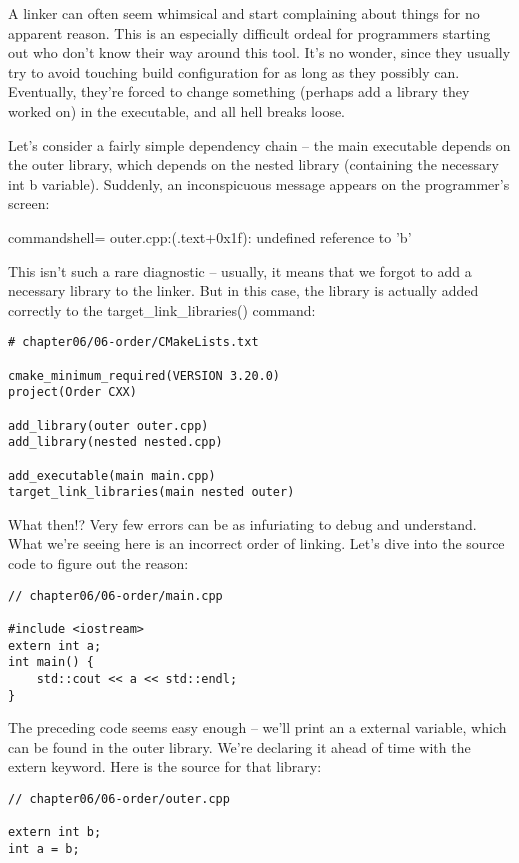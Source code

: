 A linker can often seem whimsical and start complaining about things for no apparent reason. This is an especially difficult ordeal for programmers starting out who don't know their way around this tool. It's no wonder, since they usually try to avoid touching build configuration for as long as they possibly can. Eventually, they're forced to change something (perhaps add a library they worked on) in the executable, and all hell breaks loose.

Let's consider a fairly simple dependency chain – the main executable depends on the outer library, which depends on the nested library (containing the necessary int b variable). Suddenly, an inconspicuous message appears on the programmer's screen:

\begin{tcblisting}{commandshell={}}
outer.cpp:(.text+0x1f): undefined reference to 'b'
\end{tcblisting}

This isn't such a rare diagnostic – usually, it means that we forgot to add a necessary library to the linker. But in this case, the library is actually added correctly to the target\_link\_libraries() command:

\begin{lstlisting}[style=styleCMake]
# chapter06/06-order/CMakeLists.txt

cmake_minimum_required(VERSION 3.20.0)
project(Order CXX)

add_library(outer outer.cpp)
add_library(nested nested.cpp)

add_executable(main main.cpp)
target_link_libraries(main nested outer)
\end{lstlisting}

What then!? Very few errors can be as infuriating to debug and understand. What we're seeing here is an incorrect order of linking. Let's dive into the source code to figure out the reason:

\begin{lstlisting}[style=styleCXX]
// chapter06/06-order/main.cpp

#include <iostream>
extern int a;
int main() {
	std::cout << a << std::endl;
}
\end{lstlisting}

The preceding code seems easy enough – we'll print an a external variable, which can be found in the outer library. We're declaring it ahead of time with the extern keyword. Here is the source for that library:

\begin{lstlisting}[style=styleCXX]
// chapter06/06-order/outer.cpp

extern int b;
int a = b;
\end{lstlisting}

